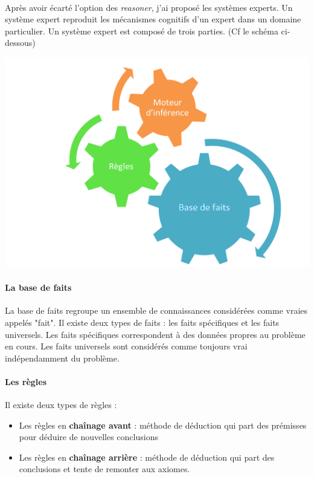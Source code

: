 \documentclass {report}
\begin{document}
\paragraph{}
Après avoir écarté l'option des \textit{reasoner}, j'ai proposé les systèmes experts. Un système expert reproduit les mécanismes cognitifs d'un expert dans un domaine particulier. Un système expert est composé de trois parties. (Cf le schéma ci-dessous)
\begin{multicols}{2}
\begin{center}
\includegraphics[scale=0.3]{se.png}
\end{center}

\paragraph{La base de faits}
La base de faits regroupe un ensemble de connaissances considérées comme vraies appelés "fait". Il existe deux types de faits : les faits spécifiques et les faits universels. Les faits spécifiques correspondent à des données propres au problème en cours. Les faits universels sont considérés comme toujours vrai indépendamment du problème.


\paragraph{Les règles}
Il existe deux types de règles : 
\begin{itemize}
    \item Les règles en \textbf{chaînage avant} : méthode de déduction qui part des prémisses pour déduire de nouvelles conclusions
    \item Les règles en \textbf{chaînage arrière} : méthode de déduction qui part des conclusions et tente de remonter aux axiomes.
\end{itemize}
\end{multicols}
\end{document}
